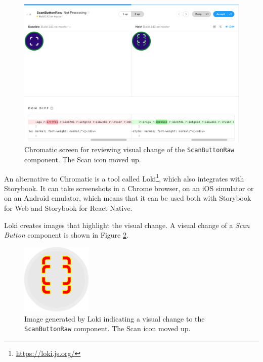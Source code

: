 \documentclass[
  digital, %
  table,   %
  oneside, %
  lof,     %
  lot,     %
]{fithesis3}
\begin{document}
\begin{figure}
    \begin{center}
        \includegraphics[width=\textwidth]{figures/other/chromatic_diff}
    \end{center}
    \caption{Chromatic screen for reviewing visual change of the \texttt{ScanButtonRaw} component. The Scan icon moved up.}
    \label{fig:chromatic_diff}
\end{figure}

An alternative to Chromatic is a tool called Loki\footnote{\url{https://loki.js.org/}}, which also integrates with Storybook. It can take screenshots in a Chrome browser, on an iOS simulator or on an Android emulator, which means that it can be used both with Storybook for Web and Storybook for React Native.

Loki creates images that highlight the visual change. A visual change of a \textit{Scan Button} component is shown in Figure \ref{fig:loki_diff}.

\begin{figure}
    \begin{center}
        \includegraphics[width=0.3\textwidth]{figures/other/loki_diff}
    \end{center}
    \caption{Image generated by Loki indicating a visual change to the \texttt{ScanButtonRaw} component. The Scan icon moved up.}
    \label{fig:loki_diff}
\end{figure}
\end{document}
